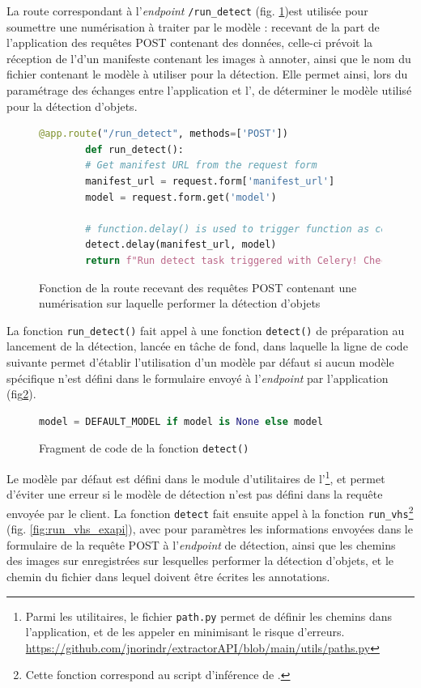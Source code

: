 	La route correspondant à l'\textit{endpoint} \texttt{/run\_detect} (fig. \ref{fig:run_detect_exapi})est utilisée pour soumettre une numérisation à traiter par le modèle : recevant de la part de l'application des requêtes \http POST contenant des données, celle-ci prévoit la réception de l'\URL d'un manifeste \iiif contenant les images à annoter, ainsi que le nom du fichier contenant le modèle à utiliser pour la détection. Elle permet ainsi, lors du paramétrage des échanges entre l'application et l'\api, de déterminer le modèle utilisé pour la détection d'objets.
	
	\begin{figure}[h]
		\begin{lstlisting}[language=Python]
		@app.route("/run_detect", methods=['POST'])
		def run_detect():
		# Get manifest URL from the request form
		manifest_url = request.form['manifest_url']
		model = request.form.get('model')
		
		# function.delay() is used to trigger function as celery task
		detect.delay(manifest_url, model)
		return f"Run detect task triggered with Celery! Check terminal to see the logs..."\end{lstlisting}
		\caption{Fonction de la route recevant des requêtes POST contenant une numérisation sur laquelle performer la détection d'objets}
		\label{fig:run_detect_exapi}
	\end{figure}

	La fonction \texttt{run\_detect()} fait appel à une fonction \texttt{detect()} de préparation au lancement de la détection, lancée en tâche de fond, dans laquelle la ligne de code suivante permet d'établir l'utilisation d'un modèle par défaut si aucun modèle spécifique n'est défini dans le formulaire envoyé à l'\textit{endpoint} par l'application (fig\ref{fig:model_exapi}).
	
	\begin{figure}[h]
		\begin{lstlisting}[language=Python]
		model = DEFAULT_MODEL if model is None else model\end{lstlisting}
		\caption{Fragment de code de la fonction \texttt{detect()}}
		\label{fig:model_exapi}
	\end{figure}

	Le modèle par défaut est défini dans le module d'utilitaires de l'\api\footnote{Parmi les utilitaires, le fichier \texttt{path.py} permet de définir les chemins dans l'application, et de les appeler en minimisant le risque d'erreurs. \url{https://github.com/jnorindr/extractorAPI/blob/main/utils/paths.py}}, et permet d'éviter une erreur si le modèle de détection n'est pas défini dans la requête envoyée par le client. La fonction \texttt{detect} fait ensuite appel à la fonction \texttt{run\_vhs}\footnote{Cette fonction correspond au script d'inférence de \yolov.} (fig. \ref{fig:run_vhs_exapi}), avec pour paramètres les informations envoyées dans le formulaire de la requête POST à l'\textit{endpoint} de détection, ainsi que les chemins des images sur enregistrées sur lesquelles performer la détection d'objets, et le chemin du fichier dans lequel doivent être écrites les annotations.
	
